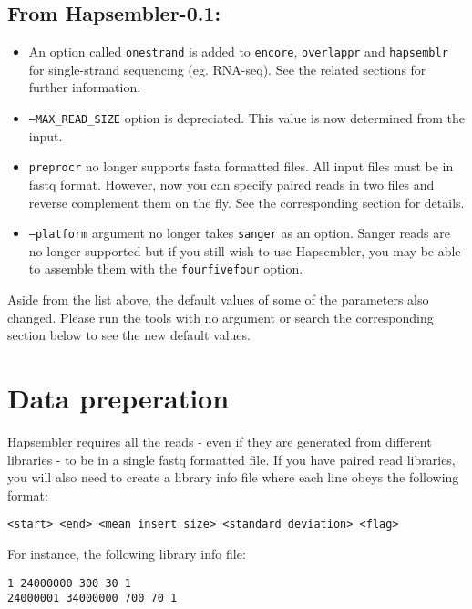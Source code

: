 \documentclass[12pt,a4paper]{report}
\begin{document}
\subsection{From Hapsembler-0.1:}

\begin{itemize}
\item An option called \texttt{onestrand} is added to \texttt{encore}, \texttt{overlappr} and \texttt{hapsemblr} for single-strand sequencing (eg. RNA-seq). See the related sections for further information. \\
\item \texttt{--MAX\_READ\_SIZE} option is depreciated. This value is now determined from the input. \\
\item \texttt{preprocr} no longer supports fasta formatted files. All input files must be in fastq format. However, now you can specify paired reads in two files and reverse complement them on the fly. See the corresponding section for details. \\
\item \texttt{--platform} argument no longer takes \texttt{sanger} as an option. Sanger reads are no longer supported but if you still wish to use Hapsembler, you may be able to assemble them with the \texttt{fourfivefour} option.
\end{itemize}

Aside from the list above, the default values of some of the parameters also changed. Please run the tools with no argument or search the corresponding section below to see the new default values.

\section{Data preperation}
\label{data}

Hapsembler requires all the reads - even if they are generated from different libraries - to be in a single fastq formatted file. If you have paired read libraries, you will also need to create a library info file where each line obeys the following format:

\begin{verbatim}
<start> <end> <mean insert size> <standard deviation> <flag>
\end{verbatim}

For instance, the following library info file:

\begin{verbatim}
1 24000000 300 30 1
24000001 34000000 700 70 1
\end{verbatim}
\end{document}
